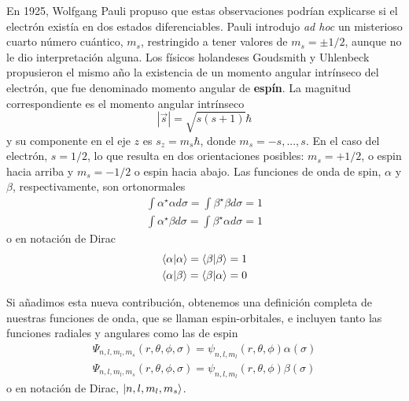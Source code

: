 \documentclass{tufte-handout}
\begin{document}
En 1925, Wolfgang Pauli propuso que estas observaciones podrían
explicarse si el electrón existía en dos estados diferenciables. 
Pauli introdujo \textit{ad hoc} un misterioso 
cuarto número cuántico, $m_s$,
restringido a tener valores de $m_s=\pm 1/2$, aunque no le dio
interpretación alguna.
Los físicos holandeses Goudsmith y Uhlenbeck propusieron el mismo año 
la existencia de un momento angular intrínseco del electrón,  que fue 
denominado momento angular de \textbf{espín}. La magnitud correspondiente 
es el momento angular intrínseco 
\begin{equation}
    |\vec{s}|=\sqrt{s(s+1)}\hbar
\end{equation}
y su componente en el eje $z$ es $s_z=m_s\hbar$, donde $m_s=-s,...,s$.
En el caso del electrón, $s=1/2$, lo que resulta en dos orientaciones
posibles: $m_s=+1/2$, o espin hacia arriba y $m_s=-1/2$ o
espin hacia abajo. Las funciones de onda de spin, $\alpha$ y $\beta$,
respectivamente, son ortonormales
\begin{align}
    \int\alpha^\star\alpha d\sigma=\int \beta^\star\beta d\sigma=1 \\
    \int\alpha^\star\beta d\sigma=\int \beta^\star\alpha d\sigma=1 
\end{align}
o en notación de Dirac
\begin{align}
    \bra{\alpha}\ket{\alpha}= \bra{\beta}\ket{\beta}=1\\
    \bra{\alpha}\ket{\beta}= \bra{\beta}\ket{\alpha}=0
\end{align}

Si añadimos esta nueva contribución, obtenemos una definición 
completa de nuestras funciones de onda, que  se llaman espin-orbitales, e incluyen tanto las funciones radiales y angulares como las de espin
\begin{align}
\Psi_{n,l,m_l,m_s}(r,\theta,\phi,\sigma)=\psi_{n,l,m_l}(r,\theta,\phi)\alpha(\sigma) \\
\Psi_{n,l,m_l,m_s}(r,\theta,\phi,\sigma)=\psi_{n,l,m_l}(r,\theta,\phi)\beta(\sigma) 
\end{align}
o en notación de Dirac, $\ket{n,l,m_l,m_s}$.
%
%
%

\end{document}
